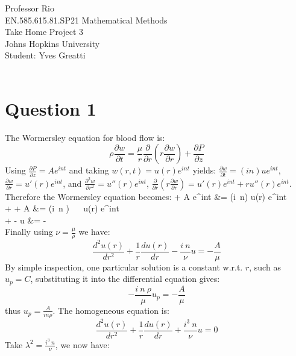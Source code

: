 \documentclass[12pt,twoside]{article}
\begin{document}
\noindent Professor Rio\\
EN.585.615.81.SP21 Mathematical Methods\\
Take Home Project 3\\
Johns Hopkins University\\
Student: Yves Greatti\\\

\section*{Question 1}
The Wormersley equation for blood flow is:
\[
	\rho \frac{\partial w}{\partial t} = \frac{\mu}{r} \frac{\partial}{\partial r}( r \frac{\partial w}{\partial r}) +\frac{\partial P}{\partial z} 
\]
Using $\frac{\partial P}{\partial z}  = A e^{int}$ and taking $w(r, t) = u(r) e^{int}$ yields: $\frac{\partial w}{\partial t} = (in) u e^{int}$,  
$\frac{\partial w}{\partial r} = u'(r) e^{int}$, and $\frac{\partial^2 w}{\partial r^2} = u''(r) e^{int}$, 
$\frac{\partial}{\partial r}( r \frac{\partial w}{\partial r}) = u'(r) e^{int} + r u''(r) e^{int}$.
Therefore the Wormersley equation becomes:
\ba
	 	+  A e^{int}		&=	\rho (i~n) u(r) e^{int} \\
	\mu {} +   + A 			&= (i~n )~ \rho ~ u(r)  e^{int} \\
	 +   -  u	&= -   \mu {} \\
\ea
Finally using $\nu = \frac{\mu}{\rho}$ we have:
\[
	\frac{d^2 u(r)}{d r^2} + \frac{1}{r} \frac{d u(r)}{d r} - \frac{i~n}{\nu} u = - \frac{A}{\mu}
\]
By simple inspection, one particular solution is a constant w.r.t. $r$, such as $u_p = C$, substituting it into the differential equation gives:
\[
	- \frac{i~n~\rho}{\mu} u_p = - \frac{A}{\mu}
\]
thus $u_p = \frac{A}{in\rho}$.
The homogeneous equation is:
\[
	\frac{d^2 u(r)}{d r^2} + \frac{1}{r} \frac{d u(r)}{d r} + \frac{i^3~n}{\nu} u = 0
\]
Take $\lambda^2 = \frac{i^3~n}{\nu}$, we now have:
\end{document}
